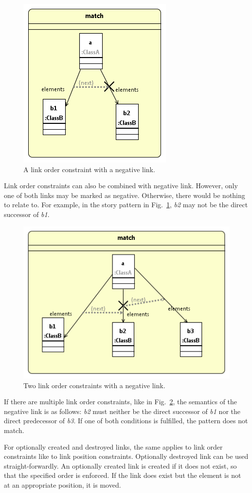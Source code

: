 {\begin{figure}[htbp]
\center
\includegraphics[width=0.4\columnwidth]{figures/linkOrderConstraint2.png}
\caption{A link order constraint with a negative link.}
\label{fig:linkOrderConstraints:linkOrderConstaint2}
\end{figure}

Link order constraints can also be combined with negative link. However, only one of both links may be marked as negative. Otherwise, there would be nothing to relate to. For example, in the story pattern in Fig.~\ref{fig:linkOrderConstraints:linkOrderConstaint2}, \emph{b2} may not be the direct successor of \emph{b1}.

\begin{figure}[htbp]
\center
\includegraphics[width=0.6\columnwidth]{figures/linkOrderConstraint3.png}
\caption{Two link order constraints with a negative link.}
\label{fig:linkOrderConstraints:linkOrderConstaint3}
\end{figure}

If there are multiple link order constraints, like in Fig.~\ref{fig:linkOrderConstraints:linkOrderConstaint3}, the semantics of the negative link is as follows: \emph{b2} must neither be the direct successor of \emph{b1} nor the direct predecessor of \emph{b3}. If one of both conditions is fulfilled, the pattern does not match.


For optionally created and destroyed links, the same applies to link order constraints like to link position constraints. Optionally destroyed link can be used straight-forwardly. An optionally created link is created if it does not exist, so that the specified order is enforced. If the link does exist but the element is not at an appropriate position, it is moved.
} %

